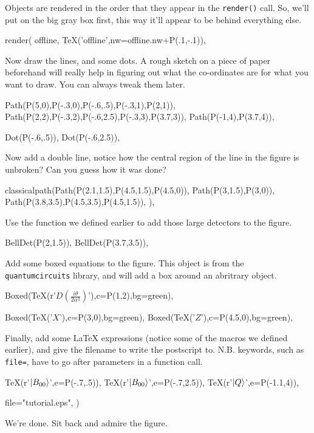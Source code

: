 \documentclass[a4paper]{book}
\begin{document}
Objects are rendered in the order that they appear in the \Verb|render()| 
call.  So, we'll put on the big gray box first, this way it'll appear to be 
behind everything else.
\begin{python}
render(
    offline,
    TeX('offline',nw=offline.nw+P(.1,-.1)),
\end{python}
Now draw the lines, and some dots. A rough sketch on a piece of paper
beforehand will really help in figuring out what the co-ordinates are
for what you want to draw. You can always tweak them later.
\begin{python}
    Path(P(5,0),P(-.3,0),P(-.6,.5),P(-.3,1),P(2,1)),
    Path(P(2,2),P(-.3,2),P(-.6,2.5),P(-.3,3),P(3.7,3)),
    Path(P(-1,4),P(3.7,4)),

    Dot(P(-.6,.5)),
    Dot(P(-.6,2.5)),
\end{python}
Now add a double line, notice how the central region of the line in
the figure is unbroken? Can you guess how it was done?
\begin{python}
    classicalpath(Path(P(2.1,1.5),P(4.5,1.5),P(4.5,0)),
                  Path(P(3,1.5),P(3,0)),
                  Path(P(3.8,3.5),P(4.5,3.5),P(4.5,1.5)),
                  ),
\end{python}
Use the function we defined earlier to add those large detectors to the figure.
\begin{python}
    BellDet(P(2,1.5)),
    BellDet(P(3.7,3.5)),
\end{python}
Add some boxed equations to the figure. This object is from the
\Verb|quantumcircuits| library, and will add a box around an
abritrary object.
\begin{python}
    Boxed(TeX(r'$D\left(\frac{i\theta}{2\alpha^2}\right)$'),c=P(1,2),bg=green),

    Boxed(TeX('$X$'),c=P(3,0),bg=green),
    Boxed(TeX('$Z$'),c=P(4.5,0),bg=green),
\end{python}
Finally, add some \LaTeX{} expressions (notice some of the macros we
defined earlier), and give the filename to write the postscript to.
N.B.  keywords, such as \Verb|file=|, have to go after parameters in a
function call.
\begin{python}
    TeX(r'$\mbox{$|B_{00}\rangle$}$',e=P(-.7,.5)),
    TeX(r'$\mbox{$|B_{00}\rangle$}$',e=P(-.7,2.5)),
    TeX(r'$\mbox{$|Q\rangle$}$',e=P(-1.1,4)),

    file="tutorial.eps",
    )
\end{python}

We're done. Sit back and admire the figure.
\end{document}
